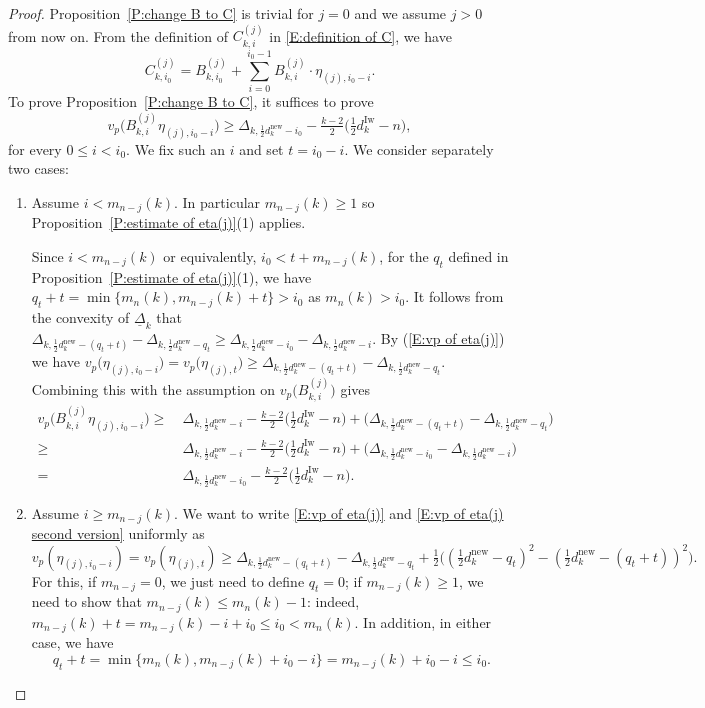\documentclass[12pt]{amsart}
\theoremstyle{definition}
\numberwithin{equation}{subsection}
\newcommand{\new}{\mathrm{new}}
\newcommand{\Iw}{\mathrm{Iw}}
\begin{document}
\begin{proof}
	Proposition~\ref{P:change B to C} is trivial for $j=0$ and we assume $j>0$ from now on.
	From the definition of $C_{k,i}^{(j)}$ in \eqref{E:definition of C}, we have 
	$$
	C_{k,i_0}^{(j)} = B_{k, i_0}^{(j)} + \sum_{i=0}^{i_0-1} B_{k,i}^{(j)} \cdot \eta_{(j),i_0-i}.
	$$
	To prove Proposition~\ref{P:change B to C}, it suffices to prove 
	\[
	v_p\big(B_{k,i}^{(j)}\eta_{(j),i_0-i} \big)\geq \Delta_{k,\frac 12 d_k^\new-i_0}-\tfrac{k-2}2 \big( \tfrac 12 d_k^\Iw-n\big),
	\]
	for every $0\leq i<i_0$. We fix such an $i$ and set $t=i_0-i$. We consider separately two cases:
\begin{enumerate}
\item Assume $i< m_{n-j}(k)$. In particular $m_{n-j}(k)\geq 1$ so Proposition~\ref{P:estimate of eta(j)}(1) applies.

Since $i<m_{n-j}(k)$ or equivalently, $i_0<t+m_{n-j}(k)$, for the $q_t$ defined in Proposition~\ref{P:estimate of eta(j)}(1), we have $q_t+t=\min\{m_n(k), m_{n-j}(k)+t \}>i_0$ as $m_n(k)>i_0$. It follows from the convexity of $\underline \Delta_k$ that $\Delta_{k,\frac 12 d_k^\new-(q_t+t)}-\Delta_{k,\frac 12 d_k^\new-q_t}\geq \Delta_{k,\frac 12 d_k^\new-i_0}-\Delta_{k,\frac 12 d_k^\new-i}$. By (\ref{E:vp of eta(j)}) we have $v_p\big(\eta_{(j),i_0-i} \big)=v_p\big(\eta_{(j),t} \big)\geq \Delta_{k,\frac 12 d_k^\new-(q_t+t)}-\Delta_{k,\frac 12 d_k^\new-q_t}$. Combining this with the assumption on $v_p\big( B_{k,i}^{(j)}\big)$ gives
		\begin{align*}
		v_p\big( B_{k,i}^{(j)} \eta_{(j), i_0-i}\big)
		\geq \ & \Delta_{k, \frac 12d_k^\new -i} - \tfrac{k-2}2\big( \tfrac 12d_k^\Iw-n\big) + \big(\Delta_{k,\frac 12d_k^\new - (q_t +t)} - \Delta_{k, \frac 12d_k^\new - q_t}\big)
		\\ \geq \ & \Delta_{k, \frac 12d_k^\new -i} - \tfrac{k-2}2\big( \tfrac 12d_k^\Iw-n\big) + \big(\Delta_{k,\frac 12d_k^\new -i_0} - \Delta_{k, \frac 12d_k^\new -i}\big)
		\\
		= \ &\Delta_{k, \frac 12d_k^\new -i_0} - \tfrac{k-2}2\big( \tfrac 12d_k^\Iw-n\big).
		\end{align*}
		
\item Assume $i\geq m_{n-j}(k)$. We want to write \eqref{E:vp of eta(j)} and \eqref{E:vp of eta(j) second version} uniformly as 
\[
v_p(\eta_{(j),i_0-i})=v_p(\eta_{(j),t}) \geq  \Delta_{k,\frac 12d_k^\new - (q_t +t)}-\Delta_{k,\frac 12d_k^\new - q_t}+\tfrac 12\big( (\tfrac 12d_k^\new - q_t)^2-(\tfrac 12d_k^\new -( q_t+t))^2\big).
\]
For this, if $m_{n-j}=0$, we just need to define $q_t=0$; 
if $m_{n-j}(k) \geq 1$, we need to show that $m_{n-j}(k) \leq m_n(k)-1$: indeed,  $m_{n-j}(k)+t=m_{n-j}(k)-i+i_0\leq i_0<m_n(k)$. In addition, in either case, we have 
$$q_t+t =\min\{m_n(k), m_{n-j}(k)+i_0-i\} = m_{n-j}(k)+i_0-i \leq i_0.$$


\end{enumerate}
\end{proof}
\end{document}
